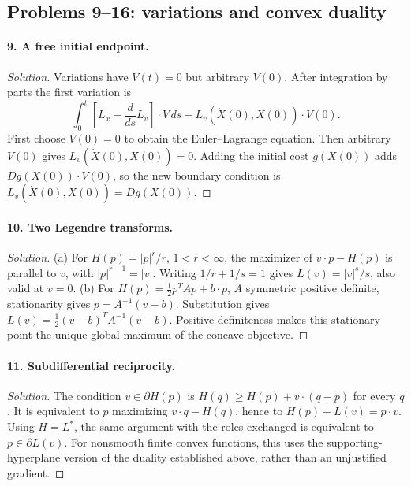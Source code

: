 \subsection{Problems 9--16: variations and convex duality}
\Needspace{30mm}
\paragraph{9. A free initial endpoint.}
\begin{proof}[Solution]
Variations have $V(t)=0$ but arbitrary $V(0)$.
After integration by parts the first variation is
\[
 \int_0^t\left[L_x-\frac d{ds}L_v\right]\cdot V\,ds
                  -L_v(\dot X(0),X(0))\cdot V(0).
\]
First choose $V(0)=0$ to obtain the Euler--Lagrange equation.
Then arbitrary $V(0)$ gives $L_v(\dot X(0),X(0))=0$.
Adding the initial cost $g(X(0))$ adds
$Dg(X(0))\cdot V(0)$, so the new boundary condition is
$L_v(\dot X(0),X(0))=Dg(X(0))$.
\end{proof}
\Needspace{45mm}

\Needspace{30mm}
\paragraph{10. Two Legendre transforms.}
\begin{proof}[Solution]
(a) For $H(p)=|p|^r/r$, $1<r<\infty$, the maximizer of $v\cdot p-H(p)$
is parallel to $v$, with $|p|^{r-1}=|v|$.
Writing $1/r+1/s=1$ gives $L(v)=|v|^s/s$, also valid at $v=0$.
(b) For $H(p)=\tfrac12p^TAp+b\cdot p$, $A$ symmetric positive definite,
stationarity gives $p=A^{-1}(v-b)$.
Substitution gives $L(v)=\tfrac12(v-b)^TA^{-1}(v-b)$.
Positive definiteness makes this stationary point the unique global maximum
of the concave objective.
\end{proof}

\Needspace{30mm}
\paragraph{11. Subdifferential reciprocity.}
\begin{proof}[Solution]
The condition $v\in\partial H(p)$ is
$H(q)\geq H(p)+v\cdot(q-p)$ for every $q$.
It is equivalent to $p$ maximizing $v\cdot q-H(q)$,
hence to $H(p)+L(v)=p\cdot v$.
Using $H=L^*$, the same argument with the roles exchanged is equivalent
to $p\in\partial L(v)$.
For nonsmooth finite convex functions, this uses the supporting-hyperplane
version of the duality established above, rather than an unjustified gradient.
\end{proof}

